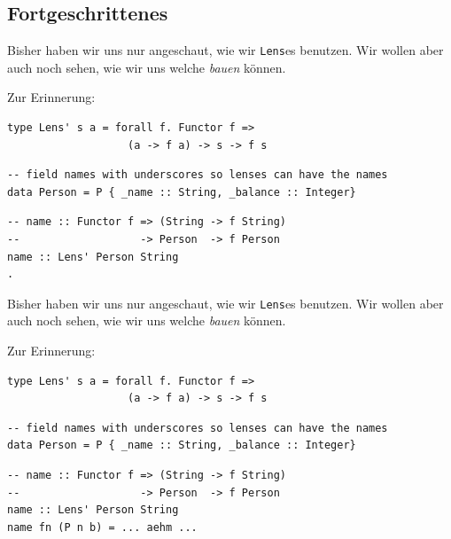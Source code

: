 \documentclass{beamer}
\begin{document}
\subsection{Fortgeschrittenes}

\begin{frame}[fragile]

Bisher haben wir uns nur angeschaut, wie wir \texttt{Lens}es benutzen. Wir wollen aber auch noch sehen, wie wir uns welche \emph{bauen} können.
\pause
\smallskip
\smallskip

Zur Erinnerung:
\begin{verbatim}
type Lens' s a = forall f. Functor f =>
                   (a -> f a) -> s -> f s
\end{verbatim}
\pause
\smallskip

\begin{verbatim}
-- field names with underscores so lenses can have the names
data Person = P { _name :: String, _balance :: Integer}
\end{verbatim}
\pause
\bigskip

\begin{verbatim}
-- name :: Functor f => (String -> f String)
--                   -> Person  -> f Person
name :: Lens' Person String
.
\end{verbatim}

\end{frame}


\begin{frame}[fragile]

Bisher haben wir uns nur angeschaut, wie wir \texttt{Lens}es benutzen. Wir wollen aber auch noch sehen, wie wir uns welche \emph{bauen} können.
\smallskip
\smallskip

Zur Erinnerung:
\begin{verbatim}
type Lens' s a = forall f. Functor f =>
                   (a -> f a) -> s -> f s
\end{verbatim}
\smallskip

\begin{verbatim}
-- field names with underscores so lenses can have the names
data Person = P { _name :: String, _balance :: Integer}
\end{verbatim}
\bigskip

\begin{verbatim}
-- name :: Functor f => (String -> f String)
--                   -> Person  -> f Person
name :: Lens' Person String
name fn (P n b) = ... aehm ...
\end{verbatim}

\end{frame}
\end{document}
